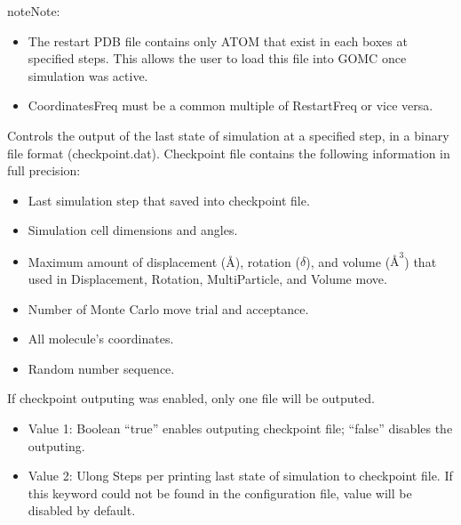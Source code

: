 \documentclass[letterpaper,10pt,english]{sphinxmanual}
\begin{document}
\begin{description}
\begin{itemize}
\end{itemize}

\begin{sphinxadmonition}{note}{Note:}\begin{itemize}
\item {} 
The restart PDB file contains only ATOM that exist in each boxes at specified steps. This allows the user to load this file into GOMC once  simulation was active.

\item {} 
CoordinatesFreq must be a common multiple of RestartFreq or vice versa.

\end{itemize}
\end{sphinxadmonition}

\item[{\sphinxcode{\sphinxupquote{CheckpointFreq}}}] \leavevmode
Controls the output of the last state of simulation at a specified step, in a binary file format (checkpoint.dat). Checkpoint file contains the following information in full precision:
\begin{itemize}
\item {} 
Last simulation step that saved into checkpoint file.

\item {} 
Simulation cell dimensions and angles.

\item {} 
Maximum amount of displacement (Å), rotation (\(\delta\)), and volume (\(Å^3\)) that used in Displacement, Rotation, MultiParticle, and Volume move.

\item {} 
Number of Monte Carlo move trial and acceptance.

\item {} 
All molecule’s coordinates.

\item {} 
Random number sequence.

\end{itemize}

If checkpoint outputing was enabled, only one file will be outputed.
\begin{itemize}
\item {} 
Value 1: Boolean \sphinxhyphen{} “true” enables outputing checkpoint file; “false” disables the outputing.

\item {} 
Value 2: Ulong \sphinxhyphen{} Steps per printing last state of simulation to checkpoint file. If this keyword could not be found in the configuration file,  value will be disabled by default.


\end{itemize}
\end{description}
\end{document}

